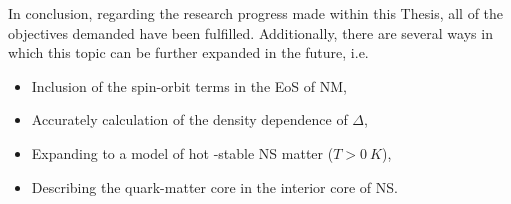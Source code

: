 In conclusion, regarding the research progress made within this Thesis, all of the objectives demanded have been fulfilled. Additionally, there are several ways in which this topic can be further expanded in the future, i.e.
\begin{itemize}
    \item Inclusion of the spin-orbit terms in the \gls{EoS} of \gls{NM},
    \item Accurately calculation of the density dependence of $\Delta$,
    \item Expanding to a model of hot \textbeta-stable \gls{NS} matter ($T>0\:K$),
    \item Describing the quark-matter core in the interior core of \gls{NS}.
\end{itemize}
